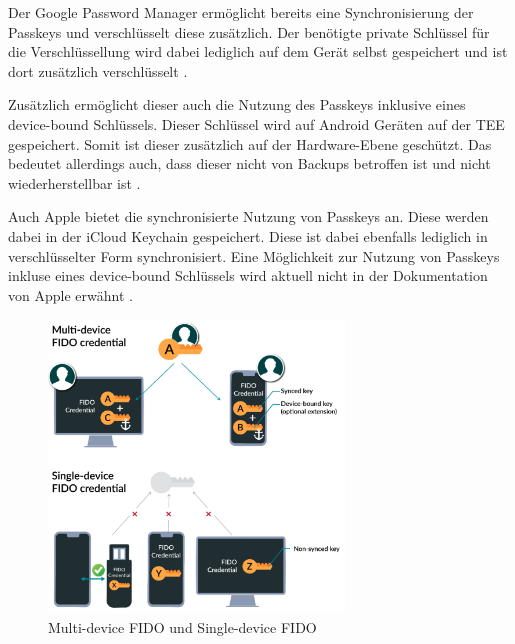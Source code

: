 Der Google Password Manager ermöglicht bereits eine Synchronisierung der Passkeys und verschlüsselt diese zusätzlich. Der benötigte private Schlüssel für die Verschlüssellung wird dabei lediglich auf dem Gerät selbst gespeichert und ist dort zusätzlich verschlüsselt \cite{passkeysgoogle}.

Zusätzlich ermöglicht dieser auch die Nutzung des Passkeys inklusive eines device-bound Schlüssels. Dieser Schlüssel wird auf Android Geräten auf der \ac{TEE} gespeichert. Somit ist dieser zusätzlich auf der Hardware-Ebene geschützt. Das bedeutet allerdings auch, dass dieser nicht von Backups betroffen ist und nicht wiederherstellbar ist \cite{passkeysgoogle}.

Auch Apple bietet die synchronisierte Nutzung von Passkeys an. Diese werden dabei in der iCloud Keychain gespeichert. Diese ist dabei ebenfalls lediglich in verschlüsselter Form synchronisiert. Eine Möglichkeit zur Nutzung von Passkeys inkluse eines device-bound Schlüssels wird aktuell nicht in der Dokumentation von Apple erwähnt \cite{passkeysapple}.

\begin{figure}[h]
	\centering 
	\includegraphics[width=0.7\textwidth]{img/abbildungen/multi-device-fido2.png}
	\captionsetup{format=hang}
	\caption{Multi-device FIDO und Single-device FIDO \cite{usecasfido}} \label{azure-seckey}
\end{figure}





